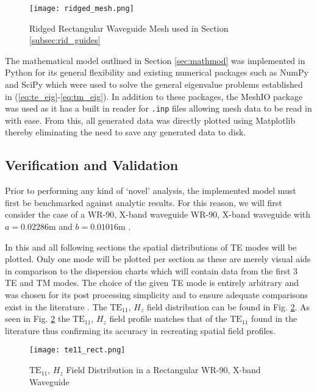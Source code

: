 \begin{figure}[h!]  
	\centering
	\texttt{[image: ridged\_mesh.png]} 
	\caption{Ridged Rectangular Waveguide Mesh used in Section \ref{subsec:rid_guides}}
	\label{fig:ridged_guide}
\end{figure}

The mathematical model outlined in Section \ref{sec:mathmod} was implemented in Python for its general flexibility and existing numerical packages such as NumPy and SciPy which were used to solve the general eigenvalue problems established in (\ref{eq:te_eig}-\ref{eq:tm_eig}). In addition to these packages, the MeshIO package was used as it has a built in reader for \verb|.inp| files allowing mesh data to be read in with ease. From this, all generated data was directly plotted using Matplotlib thereby eliminating the need to save any generated data to disk.

\subsection{Verification and Validation}
\label{subsec:vv}
Prior to performing any kind of `novel' analysis, the implemented model must first be benchmarked against analytic results. For this reason, we will first consider the case of a WR-90, X-band waveguide WR-90, X-band waveguide with $a=0.02286$m and $b=0.01016$m \cite{everythingrf}. 

In this and all following sections the spatial distributions of TE modes will be plotted. Only one mode will be plotted per section as these are merely visual aids in comparison to the dispersion charts which will contain data from the first 3 TE and TM modes. The choice of the given TE mode is entirely arbitrary and was chosen for its post processing simplicity and to ensure adequate comparisons exist in the literature \cite{pozar2011microwave}. The $\mathrm{TE}_{11}$, $H_z$ field distribution can be found in Fig. \ref{fig:reg_guide_dist}. As seen in Fig. \ref{fig:reg_guide_dist} the $\mathrm{TE_{11}}$, $H_z$ field profile matches that of the $\mathrm{TE}_{11}$ found in the literature thus confirming its accuracy in recreating spatial field profiles.

\begin{figure}[h!]  
	\centering
	\texttt{[image: te11\_rect.png]} 
	\caption{$\mathrm{TE_{11}}$, $H_z$ Field Distribution in a Rectangular WR-90, X-band Waveguide}
	\label{fig:reg_guide_dist}
\end{figure}

